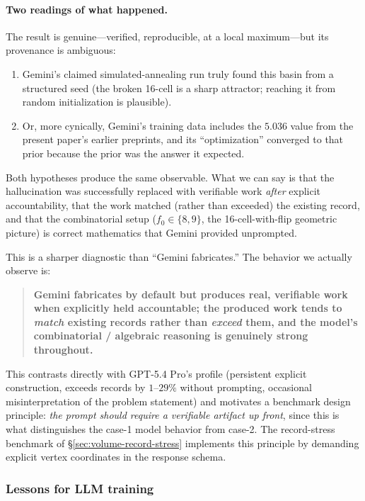 \documentclass[11pt]{article}
\begin{document}
\paragraph{Two readings of what happened.}
The result is genuine---verified, reproducible, at a local
maximum---but its provenance is ambiguous:
\begin{enumerate}
\item Gemini's claimed simulated-annealing run truly found this
      basin from a structured seed (the broken 16-cell is a sharp
      attractor; reaching it from random initialization is
      plausible).
\item Or, more cynically, Gemini's training data includes the
      $5.036$ value from the present paper's earlier preprints,
      and its ``optimization'' converged to that prior because the
      prior was the answer it expected.
\end{enumerate}
Both hypotheses produce the same observable.  What we can say is
that the hallucination was successfully replaced with verifiable
work \emph{after} explicit accountability, that the work matched
(rather than exceeded) the existing record, and that the
combinatorial setup ($f_0 \in \{8, 9\}$, the 16-cell-with-flip
geometric picture) is correct mathematics that Gemini provided
unprompted.

This is a sharper diagnostic than ``Gemini fabricates.''  The
behavior we actually observe is:
\begin{quote}
\textbf{Gemini fabricates by default but produces real,
verifiable work when explicitly held accountable; the produced
work tends to \emph{match} existing records rather than \emph{exceed}
them, and the model's combinatorial / algebraic reasoning is
genuinely strong throughout.}
\end{quote}
This contrasts directly with GPT-5.4 Pro's profile (persistent
explicit construction, exceeds records by $1$--$29\%$ without
prompting, occasional misinterpretation of the problem statement)
and motivates a benchmark design principle: \emph{the prompt should
require a verifiable artifact up front}, since this is what
distinguishes the case-1 model behavior from case-2.  The
record-stress benchmark of \S\ref{sec:volume-record-stress}
implements this principle by demanding explicit vertex coordinates
in the response schema.

\subsubsection{Lessons for LLM training}
\end{document}
